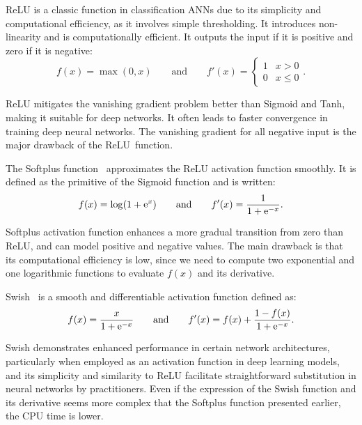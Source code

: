 \documentclass[algorithms,article,accept,pdftex,oneauthor]{Definitions/mdpi}
\DeclareRobustCommand{\e}[1]{{\rm e}^{#1}}
\begin{document}
ReLU is a classic function in classification ANNs due to its simplicity and computational efficiency, as it involves simple thresholding.
It introduces non-linearity and is computationally efficient.
It outputs the input if it is positive and zero if it is negative:
\begin{equation}
f(x) = \max(0,x)\qquad \text{and}\qquad f'(x) =
\begin{cases}
1&x>0\\
0&x\le 0
\end{cases}.\label{eq:act-relu}
\end{equation}

ReLU mitigates the vanishing gradient problem better than Sigmoid and Tanh, making it suitable for deep networks.
It often leads to faster convergence in training deep neural networks.
The vanishing gradient for all negative input is the major drawback of the ReLU~function.

The Softplus function~\cite{Dugas-2000-ISO} approximates the ReLU activation function smoothly.
It is defined as the primitive of the Sigmoid function and is written:
\begin{equation}
f(x) = \log\left(1+\e{x}\right)\qquad \text{and}\qquad f'(x) = \frac{1}{1+\e{-x}}.\label{eq:act-softplus}
\end{equation}

Softplus activation function enhances a more gradual transition from zero than ReLU, and can model positive and negative values.
The main drawback is that its computational efficiency is low, since we need to compute two exponential and one logarithmic functions to evaluate $f(x)$ and its derivative.

Swish~\cite{Ramachandran-2018-SAF} is a smooth and differentiable activation function defined as:
\begin{equation}
f(x) = \frac{x}{1+\e{-x}}\qquad \text{and}\qquad f'(x) = f(x) + \frac{1 - f(x)}{1+\e{-x}}.\label{eq:act-swish}
\end{equation}

Swish demonstrates enhanced performance in certain network architectures, particularly when employed as an activation function in deep learning models, and its simplicity and similarity to ReLU facilitate straightforward substitution in neural networks by practitioners.
Even if the expression of the Swish function and its derivative seems more complex that the Softplus function presented earlier, the CPU time is lower.
\end{document}
